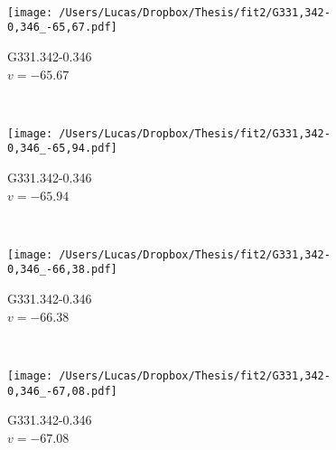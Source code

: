 \begin{figure*}[t]
\begin{subfigure}[t]{0.3\textwidth}
	\end{subfigure}
	~
	\begin{subfigure}[t]{0.3\textwidth}
		\texttt{[image: /Users/Lucas/Dropbox/Thesis/fit2/G331,342-0,346\_-65,67.pdf]}
		\caption[]{G331.342-0.346\\$v=-65.67$\,\kms}
	\end{subfigure}
	~
	\begin{subfigure}[t]{0.3\textwidth}
		\texttt{[image: /Users/Lucas/Dropbox/Thesis/fit2/G331,342-0,346\_-65,94.pdf]}
		\caption[]{G331.342-0.346\\$v=-65.94$\,\kms}
	\end{subfigure}
	~
	\begin{subfigure}[t]{0.3\textwidth}
		\texttt{[image: /Users/Lucas/Dropbox/Thesis/fit2/G331,342-0,346\_-66,38.pdf]}
		\caption[]{G331.342-0.346\\$v=-66.38$\,\kms}
	\end{subfigure}
	~
	\begin{subfigure}[t]{0.3\textwidth}
		\texttt{[image: /Users/Lucas/Dropbox/Thesis/fit2/G331,342-0,346\_-67,08.pdf]}
		\caption[]{G331.342-0.346\\$v=-67.08$\,\kms}
	\end{subfigure}
	~
\end{figure*}
\clearpage
